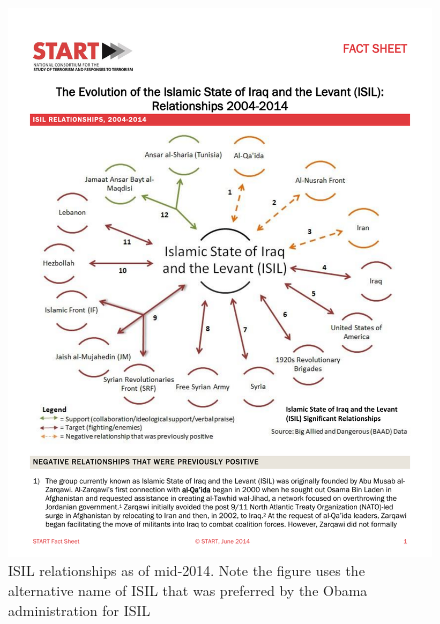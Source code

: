 \documentclass{report}
\begin{document}
 \begin{figure}[h]
 \centering
 \includegraphics[trim = 0cm 5.9cm 0cm 5.35cm, clip,scale=0.6]{./figures/ISILRelationships.pdf}
   \caption{ISIL relationships as of mid-2014.  Note the figure uses the alternative name of ISIL that was preferred by the Obama administration for ISIL \cite{NationalConsortiumfortheStudyofTerrorismandResponsestoTerrorism2014}}
     \label{fig:ISILRelationships}
\end{figure}



\end{document}
